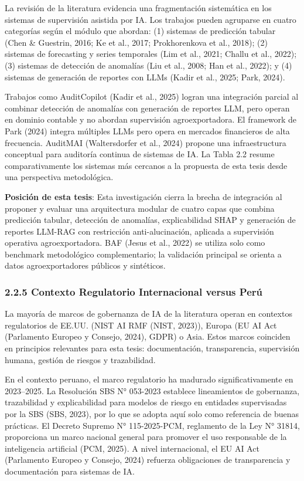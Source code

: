 La revisión de la literatura evidencia una fragmentación sistemática en
los sistemas de supervisión asistida por IA. Los trabajos pueden
agruparse en cuatro categorías según el módulo que abordan: (1) sistemas
de predicción tabular (Chen \& Guestrin, 2016; Ke et al., 2017;
Prokhorenkova et al., 2018); (2) sistemas de forecasting y series
temporales (Lim et al., 2021; Challu et al., 2022); (3) sistemas de
detección de anomalías (Liu et al., 2008; Han et al., 2022); y (4)
sistemas de generación de reportes con LLMs (Kadir et al., 2025; Park,
2024).

Trabajos como AuditCopilot (Kadir et al., 2025) logran una integración
parcial al combinar detección de anomalías con generación de reportes
LLM, pero operan en dominio contable y no abordan supervisión
agroexportadora. El framework de Park (2024) integra múltiples LLMs pero
opera en mercados financieros de alta frecuencia. AuditMAI
(Waltersdorfer et al., 2024) propone una infraestructura conceptual para
auditoría continua de sistemas de IA. La Tabla 2.2 resume
comparativamente los sistemas más cercanos a la propuesta de esta tesis
desde una perspectiva metodológica.

\textbf{Posición de esta tesis}: Esta investigación cierra la brecha de
integración al proponer y evaluar una arquitectura modular de cuatro
capas que combina predicción tabular, detección de anomalías,
explicabilidad SHAP y generación de reportes LLM-RAG con restricción
anti-alucinación, aplicada a supervisión operativa agroexportadora. BAF
(Jesus et al., 2022) se utiliza solo como benchmark metodológico
complementario; la validación principal se orienta a datos
agroexportadores públicos y sintéticos.

\subsubsection{2.2.5 Contexto Regulatorio Internacional versus
Perú}\label{contexto-regulatorio-internacional-versus-peruxfa}

La mayoría de marcos de gobernanza de IA de la literatura operan en
contextos regulatorios de EE.UU. (NIST AI RMF (NIST, 2023)), Europa (EU
AI Act (Parlamento Europeo y Consejo, 2024), GDPR) o Asia. Estos marcos
coinciden en principios relevantes para esta tesis: documentación,
transparencia, supervisión humana, gestión de riesgos y trazabilidad.

En el contexto peruano, el marco regulatorio ha madurado
significativamente en 2023--2025. La Resolución SBS N° 053-2023
establece lineamientos de gobernanza, trazabilidad y explicabilidad para
modelos de riesgo en entidades supervisadas por la SBS (SBS, 2023), por
lo que se adopta aquí solo como referencia de buenas prácticas. El
Decreto Supremo N° 115-2025-PCM, reglamento de la Ley N° 31814,
proporciona un marco nacional general para promover el uso responsable
de la inteligencia artificial (PCM, 2025). A nivel internacional, el EU
AI Act (Parlamento Europeo y Consejo, 2024) refuerza obligaciones de
transparencia y documentación para sistemas de IA.

